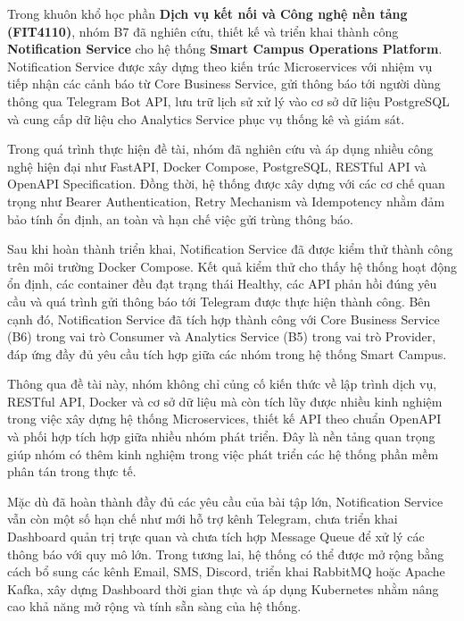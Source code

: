 
Trong khuôn khổ học phần \textbf{Dịch vụ kết nối và Công nghệ nền tảng (FIT4110)}, nhóm B7 đã nghiên cứu, thiết kế và triển khai thành công \textbf{Notification Service} cho hệ thống \textbf{Smart Campus Operations Platform}. Notification Service được xây dựng theo kiến trúc Microservices với nhiệm vụ tiếp nhận các cảnh báo từ Core Business Service, gửi thông báo tới người dùng thông qua Telegram Bot API, lưu trữ lịch sử xử lý vào cơ sở dữ liệu PostgreSQL và cung cấp dữ liệu cho Analytics Service phục vụ thống kê và giám sát.

Trong quá trình thực hiện đề tài, nhóm đã nghiên cứu và áp dụng nhiều công nghệ hiện đại như FastAPI, Docker Compose, PostgreSQL, RESTful API và OpenAPI Specification. Đồng thời, hệ thống được xây dựng với các cơ chế quan trọng như Bearer Authentication, Retry Mechanism và Idempotency nhằm đảm bảo tính ổn định, an toàn và hạn chế việc gửi trùng thông báo.

Sau khi hoàn thành triển khai, Notification Service đã được kiểm thử thành công trên môi trường Docker Compose. Kết quả kiểm thử cho thấy hệ thống hoạt động ổn định, các container đều đạt trạng thái Healthy, các API phản hồi đúng yêu cầu và quá trình gửi thông báo tới Telegram được thực hiện thành công. Bên cạnh đó, Notification Service đã tích hợp thành công với Core Business Service (B6) trong vai trò Consumer và Analytics Service (B5) trong vai trò Provider, đáp ứng đầy đủ yêu cầu tích hợp giữa các nhóm trong hệ thống Smart Campus.

Thông qua đề tài này, nhóm không chỉ củng cố kiến thức về lập trình dịch vụ, RESTful API, Docker và cơ sở dữ liệu mà còn tích lũy được nhiều kinh nghiệm trong việc xây dựng hệ thống Microservices, thiết kế API theo chuẩn OpenAPI và phối hợp tích hợp giữa nhiều nhóm phát triển. Đây là nền tảng quan trọng giúp nhóm có thêm kinh nghiệm trong việc phát triển các hệ thống phần mềm phân tán trong thực tế.

Mặc dù đã hoàn thành đầy đủ các yêu cầu của bài tập lớn, Notification Service vẫn còn một số hạn chế như mới hỗ trợ kênh Telegram, chưa triển khai Dashboard quản trị trực quan và chưa tích hợp Message Queue để xử lý các thông báo với quy mô lớn. Trong tương lai, hệ thống có thể được mở rộng bằng cách bổ sung các kênh Email, SMS, Discord, triển khai RabbitMQ hoặc Apache Kafka, xây dựng Dashboard thời gian thực và áp dụng Kubernetes nhằm nâng cao khả năng mở rộng và tính sẵn sàng của hệ thống.

